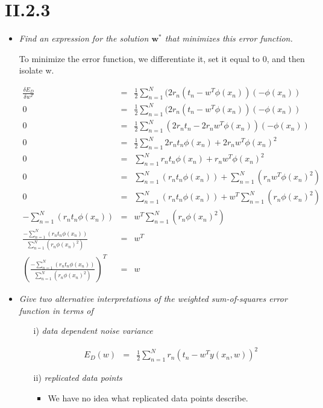 \documentclass[12pt, a4paper]{article}
\begin{document}
\section{II.2.3}
\begin{itemize}
\item \textit{Find an expression for the solution $\textbf{w}^*$ that minimizes this error function.}

To minimize the error function, we differentiate it, set it equal to 0, and then isolate w.

\begin{eqnarray}
	\frac{\delta E_D}{\delta w^T} &=& \frac{1}{2}\sum^N_{n=1}(2r_n(t_n - w^T \phi (x_n))(-\phi (x_n))\\
	0 &=& \frac{1}{2}\sum^N_{n=1}(2r_n(t_n - w^T \phi (x_n))(-\phi (x_n))\\
	0 &=& \frac{1}{2}\sum^N_{n=1}(2r_nt_n - 2r_nw^T \phi (x_n))(-\phi (x_n))\\
	0 &=& \frac{1}{2}\sum^N_{n=1}2r_nt_n\phi (x_n) + 2r_nw^T \phi (x_n)^2\\	
	0 &=& \sum^N_{n=1}r_nt_n\phi (x_n) + r_nw^T \phi (x_n)^2\\
	0 &=& \sum^N_{n=1}(r_nt_n\phi (x_n)) + \sum^N_{n=1}(r_nw^T \phi (x_n)^2)\\
	0 &=& \sum^N_{n=1}(r_nt_n\phi (x_n)) + w^T\sum^N_{n=1}(r_n \phi (x_n)^2)\\
	-\sum^N_{n=1}(r_nt_n\phi (x_n)) &=& w^T\sum^N_{n=1}(r_n \phi (x_n)^2)\\
	\frac{-\sum^N_{n=1}(r_nt_n\phi (x_n))}{\sum^N_{n=1}(r_n \phi (x_n)^2)} &=& w^T\\
	\left(\frac{-\sum^N_{n=1}(r_nt_n\phi (x_n))}{\sum^N_{n=1}(r_n \phi (x_n)^2)}\right)^T &=& w
\end{eqnarray}


\item \textit{Give two alternative interpretations of the weighted sum-of-squares
error function in terms of}
\begin{itemize}
\item[i)] \textit{data dependent noise variance}

\begin{eqnarray}
	E_D(w) &=& \frac{1}{2}\sum^N_{n=1} r_n(t_n - w^Ty(x_n, w))^2
\end{eqnarray}

\item[ii)] \textit{replicated data points}
	\begin{itemize}
		\item We have no idea what replicated data points describe.
	\end{itemize}
\end{itemize}
\end{itemize}
\end{document}

